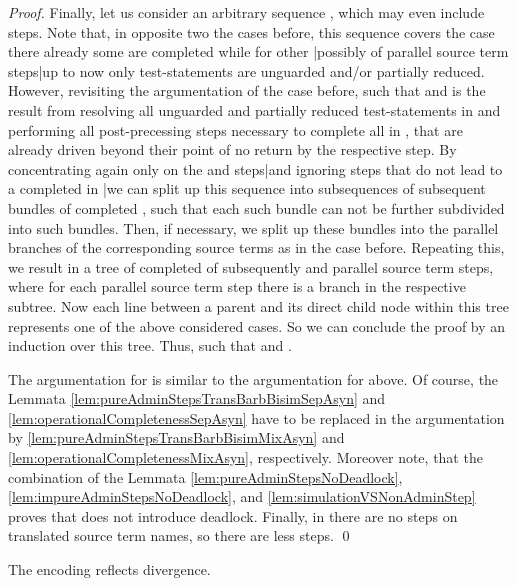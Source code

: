\documentclass[]{llncs}
\begin{document}
\begin{proof}
	Finally, let us consider an arbitrary sequence , which may even include \nonAdmin steps. Note that, in opposite two the cases before, this sequence covers the case there already some \simulations are completed while for other \simulations\!\!|possibly of parallel source term steps|up to now only test-statements are unguarded and/or partially reduced. However, revisiting the argumentation of the case before,  such that  and  is the result from resolving all unguarded and partially reduced test-statements in  and performing all post-precessing steps necessary to complete all \simulations in , that are already driven beyond their point of no return by the respective \nonAdmin step. By concentrating again only on the \impure \admin and \nonAdmin steps|and ignoring \impure \admin steps that do not lead to a completed \simulation in |we can split up this sequence into subsequences of subsequent bundles of completed \simulations, such that each such bundle can not be further subdivided into such bundles. Then, if necessary, we split up these bundles into the parallel branches of the corresponding source terms as in the case before. Repeating this, we result in a tree of completed \simulation of subsequently and parallel source term steps, where for each parallel source term step there is a branch in the respective subtree. Now each line between a parent and its direct child node within this tree represents one of the above considered cases. So we can conclude the proof by an induction over this tree. Thus,  such that  and .
	
	\vspace*{1em}
	\noindent The argumentation for  is similar to the argumentation for  above. Of course, the Lemmata \ref{lem:pureAdminStepsTransBarbBisimSepAsyn} and \ref{lem:operationalCompletenessSepAsyn} have to be replaced in the argumentation by \ref{lem:pureAdminStepsTransBarbBisimMixAsyn} and \ref{lem:operationalCompletenessMixAsyn}, respectively. Moreover note, that the combination of the Lemmata \ref{lem:pureAdminStepsNoDeadlock}, \ref{lem:impureAdminStepsNoDeadlock}, and \ref{lem:simulationVSNonAdminStep} proves that  does not introduce deadlock. Finally, in  there are no steps on translated source term names, so there are less \impure \admin steps.
	\qed
\end{proof}



\begin{lemma} \label{lem:divergenceReflectionSepAsyn}
	The encoding  reflects divergence.
\end{lemma}
\end{document}

